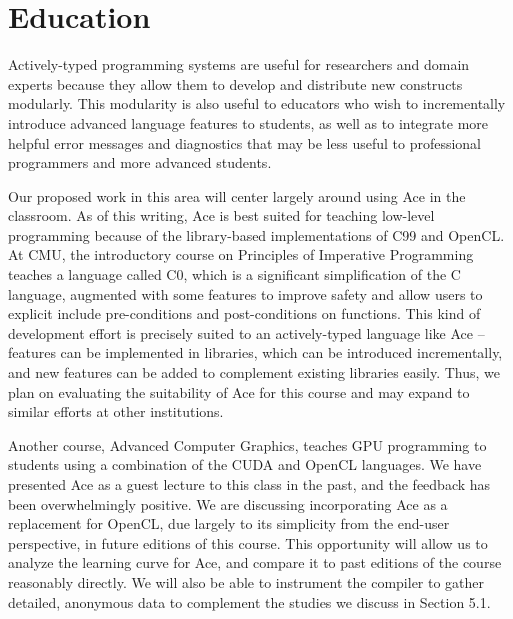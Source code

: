 \section{Education}
Actively-typed programming systems are useful for researchers and domain experts because they allow them to develop and distribute new constructs modularly. This modularity is also useful to educators who wish to incrementally introduce advanced language features to students, as well as to integrate more helpful error messages and diagnostics that may be less useful to professional programmers and more advanced students.

Our proposed work in this area will center largely around using Ace in the classroom. As of this writing, Ace is best suited for teaching low-level programming because of the library-based implementations of C99 and OpenCL. At CMU, the introductory course on Principles of Imperative Programming teaches a language called C0, which is a significant simplification of the C language, augmented with some features to improve safety and allow users to explicit include pre-conditions and post-conditions on functions. This kind of development effort is precisely suited to an actively-typed language like Ace -- features can be implemented in libraries, which can be introduced incrementally, and new features can be added to complement existing libraries easily. Thus, we plan on evaluating the suitability of Ace for this course and may expand to similar efforts at other institutions.

Another course, Advanced Computer Graphics, teaches GPU programming to students using a combination of the CUDA and OpenCL languages. We have presented Ace as a guest lecture to this class in the past, and the feedback has been overwhelmingly positive. We are discussing incorporating Ace as a replacement for OpenCL, due largely to its simplicity from the end-user perspective, in future editions of this course. This opportunity will allow us to analyze the learning curve for Ace, and compare it to past editions of the course reasonably directly. We will also be able to instrument the compiler to gather detailed, anonymous data to complement the studies we discuss in Section 5.1.